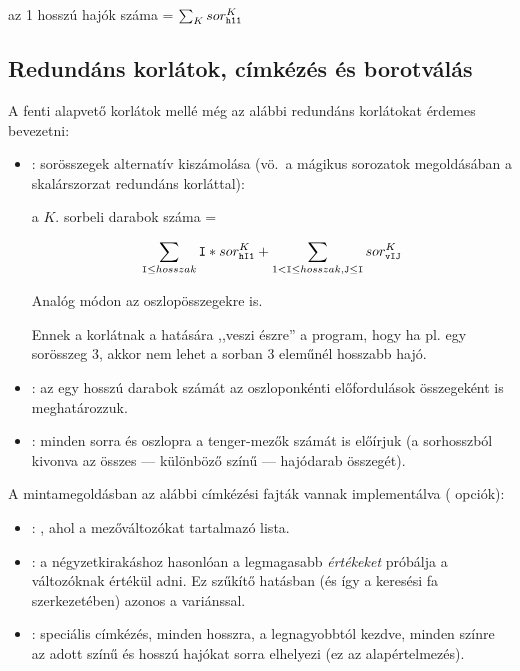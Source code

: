 \begin{center}
az 1 hosszú hajók száma = $\sum_{K} sor^K_{\tt h11} $
\end{center}

\subsection{Redundáns korlátok, címkézés és borotválás}

A fenti alapvető korlátok mellé még az alábbi redundáns korlátokat érdemes
bevezetni:

\begin{itemize}
\item {}: sorösszegek alternatív kiszámolása (vö.\ a
mágikus sorozatok megoldásában a skalárszorzat redundáns korláttal):
\begin{center}
a $K$. sorbeli darabok száma = \parbox{19em}{
{\large \[\sum_{\texttt{I}\leq hosszak} \texttt{I}*sor^K_{\texttt{hI1}} + \sum_{1<\texttt{I}\leq hosszak, \texttt{J}\leq \texttt{I}} sor^K_{\texttt{vIJ}}\]}
}\end{center}
Analóg módon az oszlopösszegekre is.

Ennek a korlátnak a hatására ,,veszi észre'' a program, hogy  ha pl. egy
sorösszeg 3, akkor nem lehet a sorban 3 eleműnél hosszabb hajó.

\item {}: az egy hosszú darabok számát az
oszloponkénti előfordulások összegeként is meghatározzuk.
\item {}: minden sorra és oszlopra a tenger-mezők
számát is előírjuk (a sorhosszból kivonva az összes --- különböző színű ---
hajódarab összegét).
\end{itemize}

A mintamegoldásban az alábbi címkézési fajták vannak implementálva
( opciók):

\begin{itemize}
\item {}: , ahol  a mezőváltozókat
        tartalmazó lista.
\item {}: a négyzetkirakáshoz hasonlóan a legmagasabb
        \emph{értékeket} próbálja a változóknak értékül adni. Ez szűkítő
        hatásban (és így a keresési fa szerkezetében) azonos a 
        variánssal.
\item {}: speciális címkézés, minden hosszra, a legnagyobbtól
        kezdve, minden színre az adott színű és hosszú hajókat sorra elhelyezi
        (ez az alapértelmezés).
\end{itemize}

